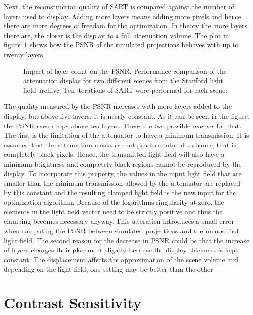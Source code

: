 Next, the reconstruction quality of SART is compared against the number of layers used to display.
Adding more layers means adding more pixels and hence there are more degrees of freedom for the optimization.
In theory the more layers there are, the closer is the display to a full attenuation volume.
The plot in figure~\ref{fig:sart_layers_vs_psnr} shows how the PSNR of the simulated projections behaves with up to twenty layers.
\begin{figure}[tb]
	\begin{subfigure}{\textwidth}
		\centering
		
	\end{subfigure}%
	\caption[Impact of layer count on \mbox{PSNR}]
			{Impact of layer count on the \mbox{PSNR}.
			 Performance comparison of the attenuation display for two different scenes from the Stanford light field archive.
			 Ten iterations of SART were performed for each scene.}
	\label{fig:sart_layers_vs_psnr}
\end{figure}
The quality measured by the \mbox{PSNR} increases with more layers added to the display, but above five layers, it is nearly constant.
As it can be seen in the figure, the \mbox{PSNR} even drops above ten layers.
There are two possible reasons for that:
The first is the limitation of the attenuator to have a minimum transmission:
It is assumed that the attenuation masks cannot produce total absorbance, that is completely black pixels.
Hence, the transmitted light field will also have a minimum brightness and completely black regions cannot be reproduced by the display.
To incorporate this property, the values in the input light field that are smaller than the minimum transmission allowed by the attenuator are replaced by this constant and the resulting clamped light field is the new input for the optimization algorithm.
Because of the logarithms singularity at zero, the elements in the light field vector need to be strictly positive and thus the clamping becomes necessary anyway.
This alteration introduces a small error when computing the \mbox{PSNR} between simulated projections and the unmodified light field.
The second reason for the decrease in \mbox{PSNR} could be that the increase of layers changes their placement slightly because the display thickness is kept constant.
The displacement affects the approximation of the scene volume and depending on the light field, one setting may be better than the other.

\section{Contrast Sensitivity}

